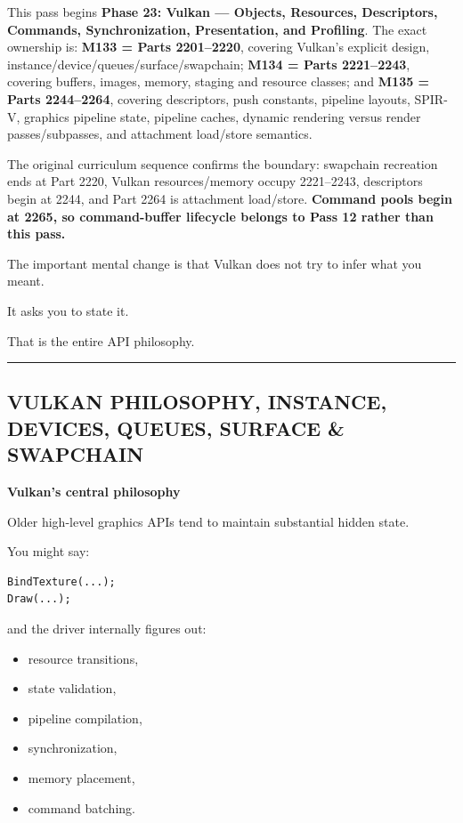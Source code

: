 This pass begins \textbf{Phase 23: Vulkan --- Objects, Resources, Descriptors, Commands, Synchronization, Presentation, and Profiling}. The exact ownership is: \textbf{M133 = Parts 2201--2220}, covering Vulkan's explicit design, instance/device/queues/surface/swapchain; \textbf{M134 = Parts 2221--2243}, covering buffers, images, memory, staging and resource classes; and \textbf{M135 = Parts 2244--2264}, covering descriptors, push constants, pipeline layouts, SPIR-V, graphics pipeline state, pipeline caches, dynamic rendering versus render passes/subpasses, and attachment load/store semantics.

The original curriculum sequence confirms the boundary: swapchain recreation ends at Part 2220, Vulkan resources/memory occupy 2221--2243, descriptors begin at 2244, and Part 2264 is attachment load/store. \textbf{Command pools begin at 2265, so command-buffer lifecycle belongs to Pass 12 rather than this pass.}

The important mental change is that Vulkan does not try to infer what you meant.

It asks you to state it.

That is the entire API philosophy.

\begin{center}\rule{0.5\linewidth}{0.5pt}\end{center}

\subsection{VULKAN PHILOSOPHY, INSTANCE, DEVICES, QUEUES, SURFACE \& SWAPCHAIN}\label{01-foundations-i-ch013-vulkan-philosophy-instance-devices-queues-surface-swapchain}

\hypertarget{01-foundations-i-ch013-vulkan-philosophy-instance-devices-queues-surface-swapchain}{}

\textbf{Vulkan's central philosophy}

Older high-level graphics APIs tend to maintain substantial hidden state.

You might say:

\begin{verbatim}
BindTexture(...);
Draw(...);
\end{verbatim}

and the driver internally figures out:

\begin{itemize}
\tightlist
\item
  resource transitions,
\item
  state validation,
\item
  pipeline compilation,
\item
  synchronization,
\item
  memory placement,
\item
  command batching.
\end{itemize}

